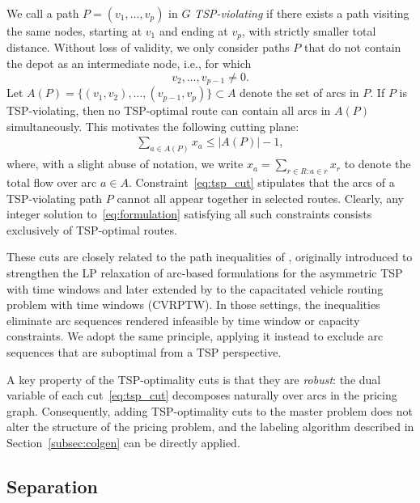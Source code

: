 \documentclass[a4paper,fleqn]{cas-dc}%
\begin{document}
We call a path $P = (v_1, \ldots, v_p)$ in $G$ \emph{TSP-violating} if there exists a path visiting the same nodes, starting at $v_1$ and ending at $v_p$, with strictly smaller total distance. Without loss of validity, we only consider paths $P$ that do not contain the depot as an intermediate node, i.e., for which
\begin{equation}
    v_2, \ldots, v_{p-1} \neq 0. \label{aspt:depot}
\end{equation}
Let $A(P) = \{(v_1, v_2), \ldots, (v_{p-1}, v_p)\} \subset A$ denote the set of arcs in $P$. If $P$ is TSP-violating, then no TSP-optimal route can contain all arcs in $A(P)$ simultaneously. This motivates the following cutting plane:
\begin{align}
    \sum_{a \in A(P)} x_a \leq |A(P)| - 1, 
    \label{eq:tsp_cut}
\end{align}
where, with a slight abuse of notation, we write $x_a = \sum_{r \in R: a \in r} x_r$ to denote the total flow over arc $a \in A$. Constraint~\eqref{eq:tsp_cut} stipulates that the arcs of a TSP-violating path $P$ cannot all appear together in selected routes. Clearly, any integer solution to~\eqref{eq:formulation} satisfying all such constraints consists exclusively of TSP-optimal routes.

These cuts are closely related to the path inequalities of \citet{ascheuer2000polyhedral}, originally introduced to strengthen the LP relaxation of arc-based formulations for the asymmetric TSP with time windows and later extended by \citet{kallehauge2007path} to the capacitated vehicle routing problem with time windows (CVRPTW). In those settings, the inequalities eliminate arc sequences rendered infeasible by time window or capacity constraints. We adopt the same principle, applying it instead to exclude arc sequences that are suboptimal from a TSP perspective.

A key property of the TSP-optimality cuts is that they are \emph{robust}: the dual variable of each cut~\eqref{eq:tsp_cut} decomposes naturally over arcs in the pricing graph. Consequently, adding TSP-optimality cuts to the master problem does not alter the structure of the pricing problem, and the labeling algorithm described in Section~\ref{subsec:colgen} can be directly applied.

\subsection{Separation}
\label{subsec:separation}
\end{document}
